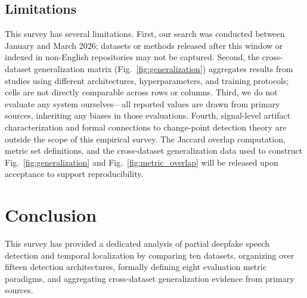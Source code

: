 \documentclass[journal]{IEEEtran}
\begin{document}
\subsection{Limitations}

This survey has several limitations. First, our search was conducted between January and March 2026; datasets or methods released after this window or indexed in non-English repositories may not be captured. Second, the cross-dataset generalization matrix (Fig.~\ref{fig:generalization}) aggregates results from studies using different architectures, hyperparameters, and training protocols; cells are not directly comparable across rows or columns. Third, we do not evaluate any system ourselves---all reported values are drawn from primary sources, inheriting any biases in those evaluations. Fourth, signal-level artifact characterization and formal connections to change-point detection theory are outside the scope of this empirical survey. The Jaccard overlap computation, metric set definitions, and the cross-dataset generalization data used to construct Fig.~\ref{fig:generalization} and Fig.~\ref{fig:metric_overlap} will be released upon acceptance to support reproducibility.

\section{Conclusion}
\label{sec:conclusion}

This survey has provided a dedicated analysis of partial deepfake speech detection and temporal localization by comparing ten datasets, organizing over fifteen detection architectures, formally defining eight evaluation metric paradigms, and aggregating cross-dataset generalization evidence from primary sources.
\end{document}
